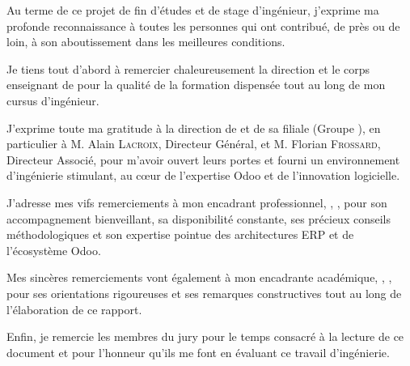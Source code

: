 Au terme de ce projet de fin d'études et de stage d'ingénieur, j'exprime ma profonde reconnaissance à toutes les personnes qui ont contribué, de près ou de loin, à son aboutissement dans les meilleures conditions.

Je tiens tout d’abord à remercier chaleureusement la direction et le corps enseignant de \textbf{\ENIS} pour la qualité de la formation dispensée tout au long de mon cursus d'ingénieur.

J'exprime toute ma gratitude à la direction de \textbf{\companyName} et de sa filiale \textbf{\companySubsidiary} (Groupe \companyGroup), en particulier à M. Alain \textsc{Lacroix}, Directeur Général, et M. Florian \textsc{Frossard}, Directeur Associé, pour m'avoir ouvert leurs portes et fourni un environnement d'ingénierie stimulant, au cœur de l'expertise Odoo et de l'innovation logicielle.

J'adresse mes vifs remerciements à mon encadrant professionnel, \textbf{\juryMemberOne}, \juryMemberOneDesc, pour son accompagnement bienveillant, sa disponibilité constante, ses précieux conseils méthodologiques et son expertise pointue des architectures ERP et de l'écosystème Odoo.

Mes sincères remerciements vont également à mon encadrante académique, \textbf{\juryMemberTwo}, \juryMemberTwoDesc, pour ses orientations rigoureuses et ses remarques constructives tout au long de l'élaboration de ce rapport.

Enfin, je remercie les membres du jury pour le temps consacré à la lecture de ce document et pour l'honneur qu'ils me font en évaluant ce travail d'ingénierie.